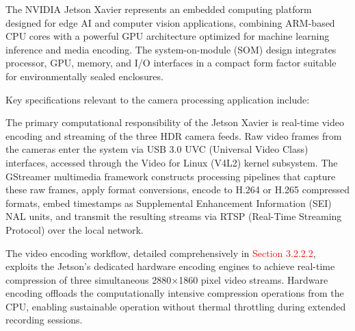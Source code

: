 \documentclass{erauthesis}
\begin{document}

The NVIDIA Jetson Xavier represents an embedded computing platform designed for edge AI and computer vision applications, combining ARM-based CPU cores with a powerful GPU architecture optimized for machine learning inference and media encoding. The system-on-module (SOM) design integrates processor, GPU, memory, and I/O interfaces in a compact form factor suitable for environmentally sealed enclosures.

Key specifications relevant to the camera processing application include:




The primary computational responsibility of the Jetson Xavier is real-time video encoding and streaming of the three HDR camera feeds. Raw video frames from the cameras enter the system via USB 3.0 UVC (Universal Video Class) interfaces, accessed through the Video for Linux (V4L2) kernel subsystem. The GStreamer multimedia framework constructs processing pipelines that capture these raw frames, apply format conversions, encode to H.264 or H.265 compressed formats, embed timestamps as Supplemental Enhancement Information (SEI) NAL units, and transmit the resulting streams via RTSP (Real-Time Streaming Protocol) over the local network.

The video encoding workflow, detailed comprehensively in \textcolor{red}{Section 3.2.2.2}, exploits the Jetson's dedicated hardware encoding engines to achieve real-time compression of three simultaneous 2880×1860 pixel video streams. Hardware encoding offloads the computationally intensive compression operations from the CPU, enabling sustainable operation without thermal throttling during extended recording sessions.
\end{document}
